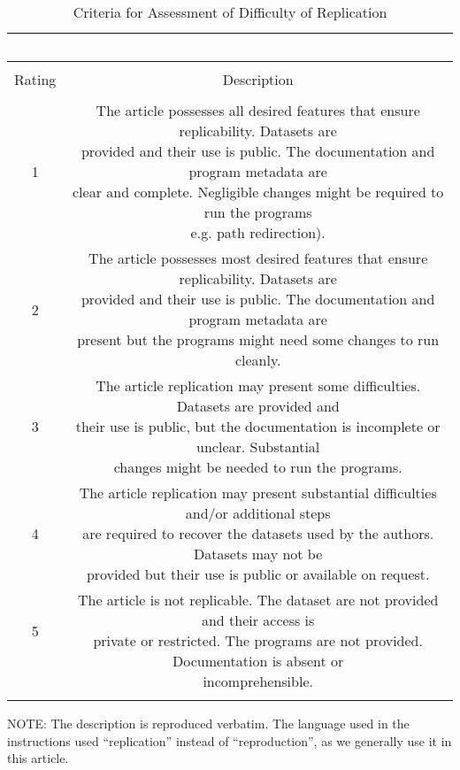 \documentclass{cje} %
\theoremstyle{plain}%
\theoremstyle{definition}
\theoremstyle{remark}
\begin{document}
\begin{table} \centering

  \caption{Criteria for Assessment of Difficulty of Replication}
  \label{tab:criteria_difficulty}

\begin{tabular}{@{\extracolsep{-5pt}} cc}
\
\\[-1.8ex]\hline
\hline \\[-1.8ex]

Rating & Description   \\
\hline \\[-1.8ex]
\tiny
\thead[bc]{~\\1\\~} & \thead{ 
 The article possesses all desired features that ensure replicability. Datasets are\\
 provided and their use is public. The documentation and program metadata are  \\ clear and complete. Negligible changes might be required to run the programs  \\ e.g. path redirection).}\\
\thead[bc]{~\\2\\~} &  \thead{The article possesses most desired features that ensure replicability. Datasets are \\ provided and their use is public. The documentation and program metadata are \\ present but the programs might need some changes to run cleanly.} \\
\thead[bc]{~\\3\\~}  & \thead{The article replication may present some difficulties. Datasets are provided and \\ their use is public, but the documentation is incomplete or unclear. Substantial  \\ changes might be needed to run the programs.}  \\
\thead[bc]{~\\4\\~} & \thead{The article replication may present substantial difficulties and/or additional steps \\ are required to recover the datasets used by the authors. Datasets may not be \\ provided but their use is public or available on request.}\\
\thead[bc]{5\\~} & \thead{The article is not replicable. The dataset are not provided and their access is \\ private or restricted. The programs are not provided. Documentation is absent or \\ incomprehensible.}   \\
\hline \\[-1.8ex]
\end{tabular}
\begin{minipage}{0.8\textwidth}
NOTE: The description is reproduced verbatim. The language used in the instructions used ``replication'' instead of ``reproduction'', as we generally use it in this article.


\end{minipage}
\end{table}
\end{document}
